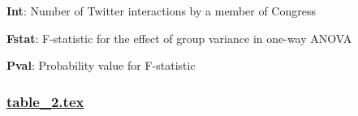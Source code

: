 \documentclass[11pt]{article}
\begin{document}
\begin{codeoutput}
\begin{table}[h]
\caption{Analysis of variance for number of interactions grouped by States}
\label{table:anova_interactions}
\begin{threeparttable}
\renewcommand{\TPTminimum}{\linewidth}
\begin{tablenotes}
\footnotesize
\item \textbf{Int}: Number of Twitter interactions by a member of Congress
\item \textbf{Fstat}: F-statistic for the effect of group variance in one-way ANOVA
\item \textbf{Pval}: Probability value for F-statistic
\end{tablenotes}
\end{threeparttable}
\end{table}

\end{codeoutput}

\subsubsection*{\hyperlink{code-LaTeX Table Design-table-2-tex}{table\_2.tex}}
\end{document}
